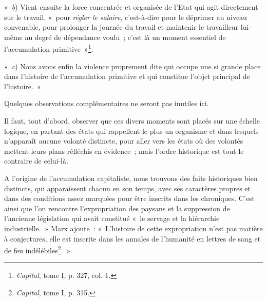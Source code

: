 \documentclass[french,twoside]{book} %
\begin{document}
 « \emph{b}) Vient ensuite la force concentrée et organisée de l’Etat qui agit directement sur le travail, « pour \emph{régler le salaire}, c’est-à-dire pour le déprimer au niveau convenable, pour prolonger la journée du travail et maintenir le travailleur lui-même au degré de dépendance voulu ; c’est là un moment essentiel de l’accumulation primitive »\footnote{ \noindent \emph{Capital}, tome I, p. 327, col. 1.
 }.\par
« \emph{c}) Nous avons enfin la violence proprement dite qui occupe une si grande place dans l’histoire de l’accumulation primitive et qui constitue l’objet principal de l’histoire. »\par
Quelques observations complémentaires ne seront pas inutiles ici.\par
Il faut, tout d’abord, observer que ces divers moments sont placés sur une échelle logique, en partant des états qui rappellent le plus un organisme et dans lesquels n’apparaît aucune volonté distincte, pour aller vers les états où des volontés mettent leurs plans réfléchis en évidence ; mais l’ordre historique est tout le contraire de celui-là.\par
A l’origine de l’accumulation capitaliste, nous trouvons des faits historiques bien distincts, qui apparaissent chacun en son temps, avec ses caractères propres et dans des conditions assez marquées pour être inscrits dans les  chroniques. C’est ainsi que l’on rencontre l’expropriation des paysans et la suppression de l’ancienne législation qui avait constitué « le servage et la hiérarchie industrielle. » Marx ajoute : « L’histoire de cette expropriation n’est pas matière à conjectures, elle est inscrite dans les annales de l’humanité en lettres de sang et de feu indélébiles\footnote{ \noindent \emph{Capital}, tome I, p. 315.
 }. »\par
\end{document}
